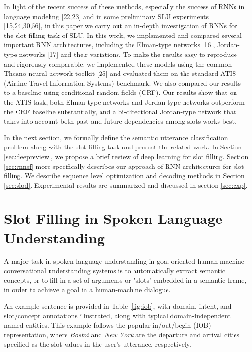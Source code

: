 In light of the recent success of these methods, especially the success of RNNs
in language modeling [22,23] and in some preliminary SLU experiments
[15,24,30,56], in this paper we carry out an in-depth investigation of RNNs for
the slot filling task of SLU. In this work, we implemented and compared several
important RNN architectures, including the Elman-type networks [16],
Jordan-type networks [17] and their variations. To make the results easy to
reproduce and rigorously comparable, we implemented these models using the
common Theano neural network toolkit [25] and evaluated them on the standard
ATIS (Airline Travel Information Systems) benchmark. We also compared our
results to a baseline using conditional random fields (CRF). Our results show
that on the ATIS task, both Elman-type networks and Jordan-type networks
outperform the CRF baseline substantially, and a bi-directional Jordan-type
network that takes into account both past and future dependencies among slots
works best.

In the next section, we formally define the semantic utterance
classification problem along with the slot filling task and present the
related work. In Section \ref{sec:deepreview}, we propose a brief review of deep learning
for slot filling. Section \ref{sec:rnnsf} more specifically describes our approach of
RNN architectures for slot filling. We describe sequence level
optimization and decoding methods in Section \ref{sec:slod}. Experimental results
are summarized and discussed in section \ref{sec:exp}.

\section{Slot Filling in Spoken Language Understanding}
\label{sec:sfslu}

A major task in spoken language understanding in goal-oriented human-machine
conversational understanding systems is to automatically extract semantic
concepts, or to fill in a set of arguments or "slots" embedded in a semantic
frame, in order to achieve a goal in a human-machine dialogue. 

An example sentence is provided in Table~\ref{fig:iob}, with domain, intent, and slot/concept
annotations illustrated, along with typical domain-independent named entities.
This example follows the popular in/out/begin (IOB) representation, where {\it
Bostoi} and {\it New York} are the departure and arrival cities specified as
the slot values in the user's utterance, respectively.

